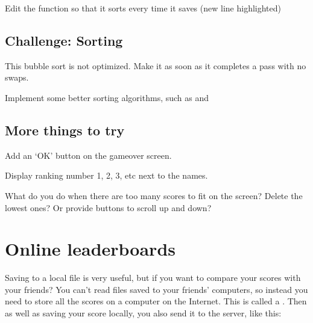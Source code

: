 \documentclass[letterpaper,10pt,english]{sphinxmanual}
\begin{document}
\sphinxAtStartPar
Edit the  function so that it sorts every time it saves
(new line highlighted)

\begin{sphinxVerbatim}[commandchars=\\\{\}]
 
       
     
\end{sphinxVerbatim}


\section{Challenge: Sorting}
\label{\detokenize{tutorial:challenge-sorting}}
\sphinxAtStartPar
This bubble sort is not optimized. Make it  as soon as it
completes a pass with no swaps.

\sphinxAtStartPar
Implement some better sorting algorithms, such as  and 


\section{More things to try}
\label{\detokenize{tutorial:more-things-to-try}}
\sphinxAtStartPar
Add an ‘OK’ button on the gameover screen.

\sphinxAtStartPar
Display ranking number 1, 2, 3, etc next to the names.

\sphinxAtStartPar
What do you do when there are too many scores to fit on the screen?
Delete the lowest ones? Or provide buttons to scroll up and down?


\chapter{Online leaderboards}
\label{\detokenize{tutorial:online-leaderboards}}
\sphinxAtStartPar
Saving to a local file is very useful, but if you want to compare your
scores with your friends? You can’t read files saved to your friends’
computers, so instead you need to store all the scores on a computer on
the Internet. This is called a . Then as well as saving your
score locally, you also send it to the server, like this:
\end{document}
